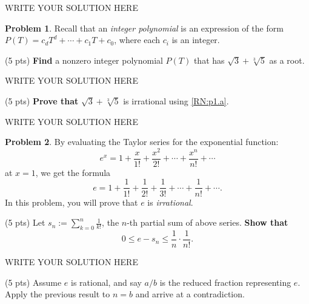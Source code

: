 \documentclass[11pt]{article}
\theoremstyle{plain}
\theoremstyle{definition}
\newtheorem{problem}{Problem}
\theoremstyle{remark}
\numberwithin{equation}{problem}
\begin{document}
\begin{solution} %
WRITE YOUR SOLUTION HERE
\end{solution}\clearpage %


\begin{problem}
	Recall that an \emph{integer polynomial} is an expression of the form $P(T)=c_dT^d+\cdots+c_1T+c_0$, where each $c_i$ is an integer. 
	\begin{listinprob}
		\item\label{RN:p1.a} (5 pts) \textbf{Find} a nonzero integer polynomial $P(T)$ that has $\sqrt{3}+\sqrt[3]{5}$ as a root.
		
\begin{solution} %
WRITE YOUR SOLUTION HERE
\end{solution}\clearpage %

		\item (5 pts) \textbf{Prove that} $\sqrt{3}+\sqrt[3]{5}$ is irrational using \ref{RN:p1.a}.
	\end{listinprob}
\end{problem}
		
\begin{solution} %
WRITE YOUR SOLUTION HERE
\end{solution}\clearpage %



\begin{problem}
	By evaluating the Taylor series for the exponential function:
	\[
		e^{x} = 1 + \frac{x}{1!} + \frac{x^2}{2!} + \cdots + \frac{x^n}{n!} + \cdots
	\]
	at $x=1$, we get the formula
	\[
		e = 1 + \frac{1}{1!} + \frac{1}{2!} + \frac{1}{3!} + \cdots + \frac{1}{n!} + \cdots.
	\]
	In this problem, you will prove that $e$ is \emph{irrational}.
	\begin{listinprob}
		\item (5 pts) Let $s_n := \sum\limits_{k=0}^n \frac{1}{k!}$, the $n$-th partial sum of above series. \textbf{Show that} 
		\[
			0 \leq e - s_n \leq \frac{1}{n}\cdot \frac{1}{n!}.
		\]
		
\begin{solution} %
WRITE YOUR SOLUTION HERE
\end{solution}\clearpage %

		\item (5 pts) Assume $e$ is rational, and say $a/b$ is the reduced fraction representing $e$. Apply the previous result to $n = b$ and arrive at a contradiction.
	\end{listinprob}
\end{problem}
		
\end{document}
